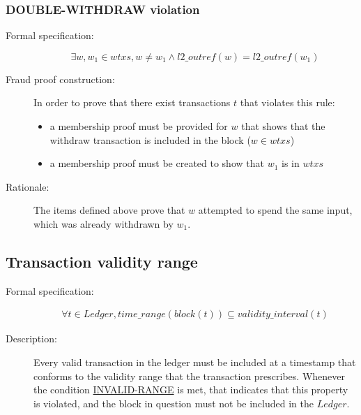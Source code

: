 \documentclass[../midgard.tex]{subfiles}
\begin{document}
\subsubsection{DOUBLE-WITHDRAW violation}
\label{violation:DOUBLE-WITHDRAW}

\begin{description}

\item[Formal specification:]
\begin{equation*}
    \exists w, w_1 \in wtxs, w \neq w_1 \land l2\_outref(w) = l2\_outref(w_1)
\end{equation*}

\item[Fraud proof construction:] In order to prove that there exist transactions $t$ that violates this rule:
\begin{itemize}
    \item a membership proof must be provided for $w$ that shows that the withdraw transaction is included in the block ($w \in wtxs$)
    \item a membership proof must be created to show that $w_1$ is in $wtxs$
\end{itemize}

\item[Rationale:] The items defined above prove that $w$ attempted to spend the same input, which was already withdrawn by $w_1$.

\end{description}

\subsection{Transaction validity range}
\label{rule:transaction-validity-range}

\begin{description}

\item[Formal specification:]
\todo
\begin{equation*}
\begin{split}
    \forall t \in Ledger, time\_range(block(t)) \subseteq validity\_interval(t)
\end{split}
\end{equation*}

\item[Description:] Every valid transaction in the ledger must be included at a timestamp that conforms to the validity range that the transaction prescribes.
  Whenever the condition \hyperref[violation:INVALID-RANGE]{INVALID-RANGE} is met, that indicates that this property is violated, and the block in question must not be included in the $Ledger$.

\end{description}
\end{document}
